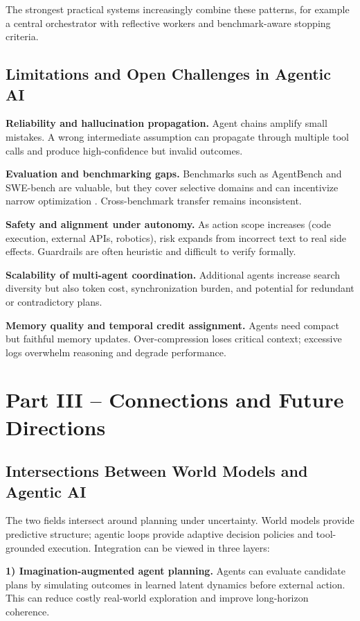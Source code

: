 \documentclass[conference]{IEEEtran}
\begin{document}
The strongest practical systems increasingly combine these patterns, for example a central orchestrator with reflective workers and benchmark-aware stopping criteria.

\subsection{Limitations and Open Challenges in Agentic AI}
\textbf{Reliability and hallucination propagation.} Agent chains amplify small mistakes. A wrong intermediate assumption can propagate through multiple tool calls and produce high-confidence but invalid outcomes.

\textbf{Evaluation and benchmarking gaps.} Benchmarks such as AgentBench and SWE-bench are valuable, but they cover selective domains and can incentivize narrow optimization \cite{liu2024agentbench, jimenez2024swebench}. Cross-benchmark transfer remains inconsistent.

\textbf{Safety and alignment under autonomy.} As action scope increases (code execution, external APIs, robotics), risk expands from incorrect text to real side effects. Guardrails are often heuristic and difficult to verify formally.

\textbf{Scalability of multi-agent coordination.} Additional agents increase search diversity but also token cost, synchronization burden, and potential for redundant or contradictory plans.

\textbf{Memory quality and temporal credit assignment.} Agents need compact but faithful memory updates. Over-compression loses critical context; excessive logs overwhelm reasoning and degrade performance.

\section{Part III -- Connections and Future Directions}
\subsection{Intersections Between World Models and Agentic AI}
The two fields intersect around planning under uncertainty. World models provide predictive structure; agentic loops provide adaptive decision policies and tool-grounded execution. Integration can be viewed in three layers:

\textbf{1) Imagination-augmented agent planning.}
Agents can evaluate candidate plans by simulating outcomes in learned latent dynamics before external action. This can reduce costly real-world exploration and improve long-horizon coherence.
\end{document}
